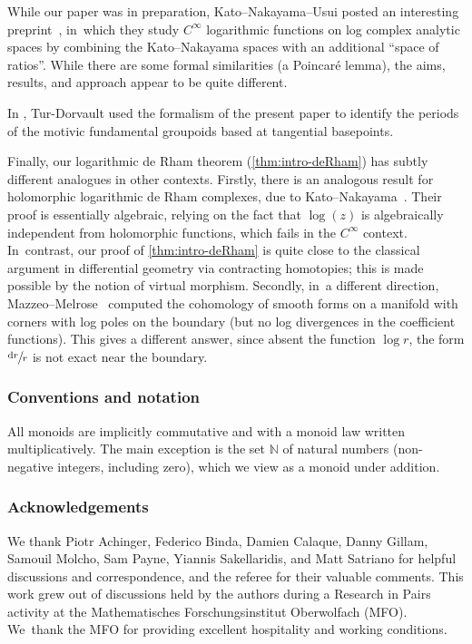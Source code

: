 \documentclass[JEP,XML,SOM,Unicode,NoFloatCountersInSection,published]{cedram}
\newcommand{\dslog}[1]{\sfrac{\dd#1}{#1}}
\theoremstyle{definition}
\theoremstyle{remark}
\newcommand{\NN}{\mathbb{N}}
\newcommand{\dd}{\mathrm{d}}
\begin{document}
While our paper was in preparation, Kato--Nakayama--Usui posted an interesting preprint~\cite{KatoNakayamaUsui}, in~which they study $C^\infty$ logarithmic functions on log complex analytic spaces by combining the Kato--Nakayama spaces with an additional ``space of ratios''. While there are some formal similarities (\eg a Poincaré lemma), the aims, results, and approach appear to be quite different.

In \cite{turdorvault}, Tur-Dorvault used the formalism of the present paper to identify the periods of the motivic fundamental groupoids based at tangential basepoints.

Finally, our logarithmic de Rham theorem (\autoref{thm:intro-deRham}) has subtly different analogues in other contexts. Firstly, there is an analogous result for holomorphic logarithmic de Rham complexes, due to Kato--Nakayama~\cite{KatoNakayama}. Their proof is essentially algebraic, relying on the fact that $\log(z)$ is algebraically independent from holomorphic functions, which fails in the $C^\infty$ context. In~contrast, our proof of \autoref{thm:intro-deRham} is quite close to the classical argument in differential geometry via contracting homotopies; this is made possible by the notion of virtual morphism. Secondly, in~a different direction, Mazzeo--Melrose~\cite[\S2.16]{Melrose1993} computed the cohomology of smooth forms on a manifold with corners with log poles on the boundary (but no log divergences in the coefficient functions). This gives a different answer, since absent the function $\log r$, the form $\dslog r$ is not exact near the boundary.

\subsubsection*{Conventions and notation}

All monoids are implicitly commutative and with a monoid law written multiplicatively. The main exception is the set $\NN$ of natural numbers (\ie non-negative integers, including zero), which we view as a monoid under addition.\enlargethispage{.5\baselineskip}

\subsubsection*{Acknowledgements} We thank Piotr Achinger, Federico Binda, Damien Calaque, Danny Gillam, Samouil Molcho, Sam Payne, Yiannis Sakellaridis, and Matt \hbox{Satriano} for helpful discussions and correspondence, and the referee for their valuable comments. This work grew out of discussions held by the authors during a Research in Pairs activity at the Mathematisches Forschungsinstitut Oberwolfach (MFO). We~thank the MFO for providing excellent hospitality and working conditions.
\end{document}
